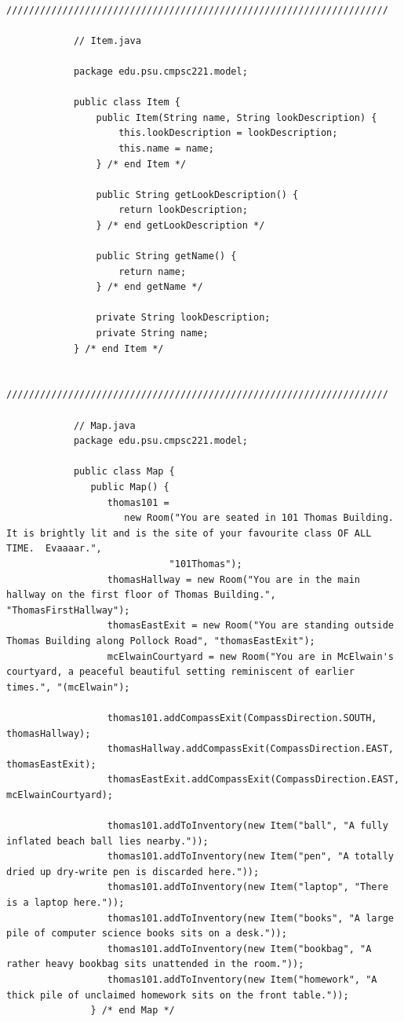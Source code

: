 \documentclass[a4paper, 11pt]{article}
\begin{document}
\begin{lstlisting}
            ////////////////////////////////////////////////////////////////////

            // Item.java

            package edu.psu.cmpsc221.model;

            public class Item {
                public Item(String name, String lookDescription) {
                    this.lookDescription = lookDescription;
                    this.name = name;
                } /* end Item */

                public String getLookDescription() {
                    return lookDescription;
                } /* end getLookDescription */

                public String getName() {
                    return name;
                } /* end getName */

                private String lookDescription;
                private String name;
            } /* end Item */

            ////////////////////////////////////////////////////////////////////

            // Map.java
            package edu.psu.cmpsc221.model;

            public class Map {
               public Map() {
                  thomas101 =
                     new Room("You are seated in 101 Thomas Building.  It is brightly lit and is the site of your favourite class OF ALL TIME.  Evaaaar.",
                             "101Thomas");
                  thomasHallway = new Room("You are in the main hallway on the first floor of Thomas Building.", "ThomasFirstHallway");
                  thomasEastExit = new Room("You are standing outside Thomas Building along Pollock Road", "thomasEastExit");
                  mcElwainCourtyard = new Room("You are in McElwain's courtyard, a peaceful beautiful setting reminiscent of earlier times.", "(mcElwain");

                  thomas101.addCompassExit(CompassDirection.SOUTH, thomasHallway);
                  thomasHallway.addCompassExit(CompassDirection.EAST, thomasEastExit);
                  thomasEastExit.addCompassExit(CompassDirection.EAST, mcElwainCourtyard);

                  thomas101.addToInventory(new Item("ball", "A fully inflated beach ball lies nearby."));
                  thomas101.addToInventory(new Item("pen", "A totally dried up dry-write pen is discarded here."));
                  thomas101.addToInventory(new Item("laptop", "There is a laptop here."));
                  thomas101.addToInventory(new Item("books", "A large pile of computer science books sits on a desk."));
                  thomas101.addToInventory(new Item("bookbag", "A rather heavy bookbag sits unattended in the room."));
                  thomas101.addToInventory(new Item("homework", "A thick pile of unclaimed homework sits on the front table."));
               } /* end Map */


\end{lstlisting}
\end{document}
